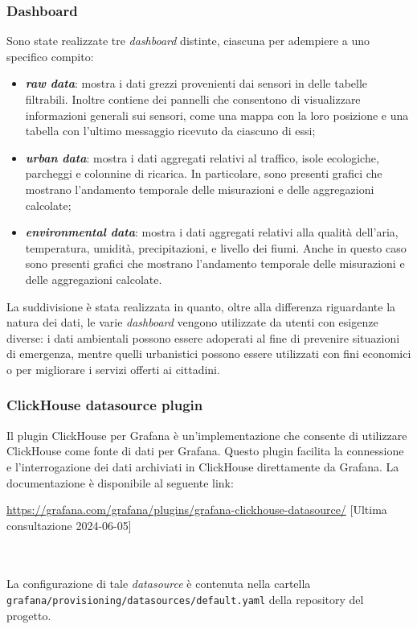 \subsubsection{Dashboard}
Sono state realizzate tre \textit{dashboard} distinte, ciascuna per adempiere a uno specifico compito:
\begin{itemize}
	\item \textbf{\textit{raw data}}: mostra i dati grezzi provenienti dai sensori in delle tabelle filtrabili. Inoltre contiene dei pannelli che consentono
	      di visualizzare informazioni generali sui sensori, come una mappa con la loro posizione e una tabella con l'ultimo messaggio ricevuto da ciascuno di essi;
	\item \textbf{\textit{urban data}}: mostra i dati aggregati relativi al traffico, isole ecologiche, parcheggi e colonnine di ricarica. In particolare, sono presenti
	      grafici che mostrano l'andamento temporale delle misurazioni e delle aggregazioni calcolate;
	\item \textbf{\textit{environmental data}}: mostra i dati aggregati relativi alla qualità dell'aria, temperatura, umidità, precipitazioni, e livello dei fiumi.
	      Anche in questo caso sono presenti grafici che mostrano l'andamento temporale delle misurazioni e delle aggregazioni calcolate.
\end{itemize}
La suddivisione è stata realizzata in quanto, oltre alla differenza riguardante la natura dei dati, le varie \textit{dashboard} vengono utilizzate da utenti con esigenze diverse:
i dati ambientali possono essere adoperati al fine di prevenire situazioni di emergenza, mentre quelli urbanistici possono essere utilizzati con fini economici
o per migliorare i servizi offerti ai cittadini.

\subsubsection{ClickHouse datasource plugin}
Il plugin ClickHouse per Grafana è un'implementazione che consente di utilizzare ClickHouse come fonte di dati per Grafana. Questo plugin facilita la connessione e l'interrogazione dei dati archiviati in ClickHouse direttamente da Grafana.
La documentazione è disponibile al seguente link:
\begin{center}
	\url{https://grafana.com/grafana/plugins/grafana-clickhouse-datasource/} [Ultima consultazione 2024-06-05]
\end{center}
\\\\
La configurazione di tale \textit{datasource} è contenuta nella cartella \\\texttt{grafana/provisioning/datasources/default.yaml} della repository del progetto.

